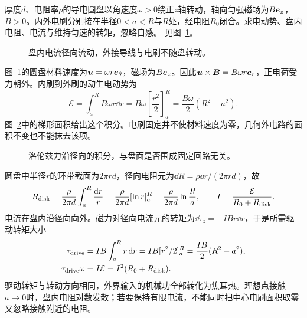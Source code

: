 \begin{exercise}[带有限电刷半径的同极圆盘]\label{ex:i1-h9}
厚度$d$、电阻率$\rho$的导电圆盘以角速度$\omega>0$绕正$z$轴转动，轴向匀强磁场为$B\bm{e}_z$，$B>0$。内外电刷分别接在半径$0<a<R$与$R$处，经电阻$R_0$闭合。求电动势、盘内电阻、电流与维持匀速的转矩，忽略自感。 见图~\ref{fig:i1-h9-q}。
\end{exercise}

\begin{figure}[H]\centering
{}
\caption{盘内电流径向流动，外接导线与电刷不随盘转动。}\label{fig:i1-h9-q}
\end{figure}
\begin{solution}
图~\ref{fig:i1-h9-q}的圆盘材料速度为$\bm{u}=\omega r\bm{e}_\theta$，磁场为$B\bm{e}_z$。因此$\bm{u}\times\bm{B}=B\omega r\bm{e}_r$，正电荷受力朝外。内刷到外刷的动生电动势为
\[\boxed{\mathcal E=\int_a^RB\omega r\dd r
=B\omega\left[\frac{r^2}2\right]_a^R
=\frac{B\omega}{2}(R^2-a^2)}.
\]
图~\ref{fig:i1-h9-s}中的梯形面积给出这个积分。电刷固定并不使材料速度为零，几何外电路的面积不变也不能抹去该项。


\begin{figure}[H]\centering
{}
\caption{洛伦兹力沿径向的积分，与盘面是否围成固定回路无关。}\label{fig:i1-h9-s}
\end{figure}

圆盘中半径$r$的环带截面为$2\pi rd$，径向电阻元为$\dd R=\rho\dd r/(2\pi rd)$，故
\[R_{\rm disk}=\frac\rho{2\pi d}\int_a^R\frac{\mathop{}\!\mathrm d r}r
=\frac\rho{2\pi d}[\ln r]_a^R=\frac\rho{2\pi d}\ln\frac Ra,\qquad
I=\frac{\mathcal E}{R_0+R_{\rm disk}}.
\]
电流在盘内沿径向向外。磁力对径向电流元的转矩为$\dd\tau_z=-IBr\dd r$，于是所需驱动转矩大小
\[\begin{aligned}
\tau_{\rm drive}&=IB\int_a^Rr\mathop{}\!\mathrm d r
=IB[r^2/2]_a^R=\frac{IB}{2}(R^2-a^2),\\
\tau_{\rm drive}\omega&=I\mathcal E=I^2(R_0+R_{\rm disk}).
\end{aligned}\]
驱动转矩与转动方向相同，外界输入的机械功全部转化为焦耳热。理想点接触$a\to0$时，盘内电阻对数发散；若要保持有限电流，不能同时把中心电刷面积取零又忽略接触附近的电阻。
\end{solution}

